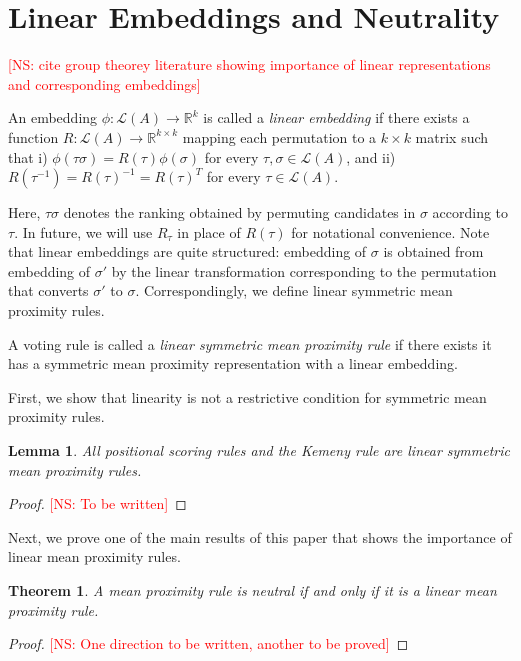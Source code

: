 \documentclass[10pt,letterpaper]{article}
\newcommand{\calL}{{\mathcal{L}}}
\newcommand{\rank}{{\calL(A)}}
\newtheorem{theorem}{Theorem}
\newtheorem{lemma}{Lemma}
\newenvironment{definition}[1][Definition]{\begin{trivlist}
\item[\hskip \labelsep {\bfseries #1}]}{\end{trivlist}}
\newcommand{\kibitz}[2]{\ifnum\Comments=1\textcolor{#1}{#2}\fi}
\newcommand{\cns}[1]{\kibitz{red} {[NS: #1]}}
\begin{document}

\section{Linear Embeddings and Neutrality}

\cns{cite group theorey literature showing importance of linear representations and corresponding embeddings}

\begin{definition}[Linear Embeddings]
An embedding $\phi:\rank \rightarrow \mathbb{R}^k$ is called a \emph{linear embedding} if there exists a function $R : \rank \rightarrow \mathbb{R}^{k \times k}$ mapping each permutation to a $k \times k$ matrix such that i) $\phi(\tau \sigma) = R(\tau) \phi(\sigma)$ for every $\tau,\sigma \in \rank$, and ii) $R(\tau^{-1}) = R(\tau)^{-1} = R(\tau)^T$ for every $\tau \in \rank$. 
\end{definition}

Here, $\tau \sigma$ denotes the ranking obtained by permuting candidates in $\sigma$ according to $\tau$. In future, we will use $R_{\tau}$ in place of $R(\tau)$ for notational convenience. Note that linear embeddings are quite structured: embedding of $\sigma$ is obtained from embedding of $\sigma'$ by the linear transformation corresponding to the permutation that converts $\sigma'$ to $\sigma$. Correspondingly, we define linear symmetric mean proximity rules.

\begin{definition}[Linear Symmetric Mean Proximity Rule]
A voting rule is called a \emph{linear symmetric mean proximity rule} if there exists it has a symmetric mean proximity representation with a linear embedding. 
\end{definition}

First, we show that linearity is not a restrictive condition for symmetric mean proximity rules.

\begin{lemma}
All positional scoring rules and the Kemeny rule are linear symmetric mean proximity rules.
\label{lem:linear-captures}
\end{lemma}
\begin{proof}
\cns{To be written}
\end{proof}

Next, we prove one of the main results of this paper that shows the importance of linear mean proximity rules. 
\begin{theorem}
A mean proximity rule is neutral if and only if it is a linear mean proximity rule. 
\label{thm:linear-neutral}
\end{theorem}
\begin{proof}
\cns{One direction to be written, another to be proved}
\end{proof}
\end{document}

